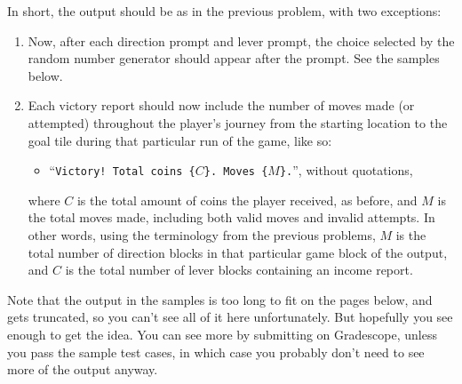In short, the output should be as in the previous problem, with two exceptions:
\begin{enumerate}
    \item
    Now, after each direction prompt and lever prompt,
    the choice selected by the random number generator
    should appear after the prompt.
    See the samples below.
    \item
    Each victory report should now include the number of moves made (or attempted)
    throughout the player's journey from the starting location to the goal tile
    during that particular run of the game, like so:
    \begin{itemize}
        \item
        ``\texttt{Victory! Total coins \{$C$\}. Moves \{$M$\}.}'', without quotations,
    \end{itemize}
    where $C$ is the total amount of coins the player received, as before,
    and $M$ is the total moves made, including both valid moves and invalid attempts.
    In other words, using the terminology from the previous problems,
    $M$ is the total number of direction blocks
    in that particular game block of the output,
    and $C$ is the total number of lever blocks containing an income report.
\end{enumerate}

Note that the output in the samples is too long to fit on the pages below,
and gets truncated, so you can't see all of it here unfortunately.
But hopefully you see enough to get the idea.
You can see more by submitting on Gradescope,
unless you pass the sample test cases,
in which case you probably don't need to see more of the output anyway.
